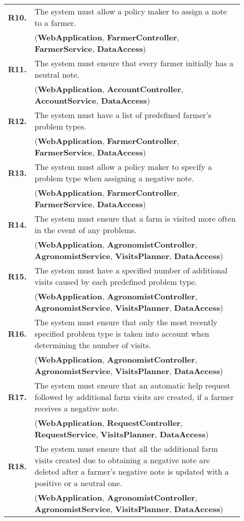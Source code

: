\begin{longtable}{p{0.06\linewidth} p{0.88\linewidth}}
	\textbf{R10.} & The system must allow a policy maker to assign a note to a farmer.\\
	& (\textbf{WebApplication}, \textbf{FarmerController}, \textbf{FarmerService}, \textbf{DataAccess})\\
	\textbf{R11.} & The system must ensure that every farmer initially has a neutral note.\\
	& (\textbf{WebApplication}, \textbf{AccountController}, \textbf{AccountService}, \textbf{DataAccess})\\
	\textbf{R12.} & The system must have a list of predefined farmer's problem types.\\
	& (\textbf{WebApplication}, \textbf{FarmerController}, \textbf{FarmerService}, \textbf{DataAccess})\\
    \textbf{R13.} & The system must allow a policy maker to specify a problem type when assigning a negative note.\\
    & (\textbf{WebApplication}, \textbf{FarmerController}, \textbf{FarmerService}, \textbf{DataAccess})\\
    \textbf{R14.} & The system must ensure that a farm is visited more often in the event of any problems.\\
    & (\textbf{WebApplication}, \textbf{AgronomistController}, \textbf{AgronomistService}, \textbf{VisitsPlanner}, \textbf{DataAccess})\\
    \textbf{R15.} & The system must have a specified number of additional visits caused by each predefined problem type.\\
    & (\textbf{WebApplication}, \textbf{AgronomistController}, \textbf{AgronomistService}, \textbf{VisitsPlanner}, \textbf{DataAccess})\\
    \textbf{R16.} & The system must ensure that only the most recently specified problem type is taken into account when determining the number of visits.\\
    & (\textbf{WebApplication}, \textbf{AgronomistController}, \textbf{AgronomistService}, \textbf{VisitsPlanner}, \textbf{DataAccess})\\
	\textbf{R17.} & The system must ensure that an automatic help request followed by additional farm visits are created, if a farmer receives a negative note.\\
	& (\textbf{WebApplication}, \textbf{RequestController}, \textbf{RequestService}, \textbf{VisitsPlanner}, \textbf{DataAccess})\\
	\textbf{R18.} & The system must ensure that all the additional farm visits created due to obtaining a negative note are deleted after a farmer's negative note is updated with a positive or a neutral one.\\
	& (\textbf{WebApplication}, \textbf{AgronomistController}, \textbf{AgronomistService}, \textbf{VisitsPlanner}, \textbf{DataAccess})\\
	

\end{longtable}
